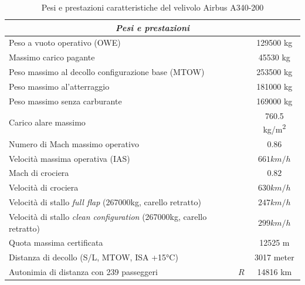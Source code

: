 \begin{table} [!h]\centering {}
	\begin{tabular}{l c c}
		\toprule
		\multicolumn{3}{c}{\emph{Pesi e prestazioni}} \\ 
		\midrule
		Peso a vuoto operativo (OWE) & \WOE & 129500 \si{kg} \\
		Massimo carico pagante & \WPLmax & 45530 \si{kg} \\
		Peso massimo al decollo configurazione base (MTOW)   &\MTOW & 253500 \si{kg} \\
		Peso massimo al'atterraggio    &\WLmax & 181000 \si{kg} \\
		Peso massimo senza carburante    &\Wzfmax & 169000 \si{kg} \\
		Carico alare massimo   &\WoverSmax & 760.5 \si{kg/m^2} \\
		\midrule		
		Numero di Mach massimo operativo & \Mmo & 0.86 \\
		Velocità massima operativa (IAS)  & \Vmo 	&  	$661 \si{km/h} $ 	\\
		Mach di crociera & \Mc &  	$0.82 $ 	\\
		Velocità di crociera & \Vc &  	$630 \si{km/h}$ 	\\
		Velocità di stallo {\itshape full flap} (267000kg, carello retratto)	 & \Vsf 	&  	$247 \si{km/h} $  	\\
		Velocità di stallo {\itshape clean configuration} (267000kg, carello retratto)   & \Vsc&  $299 \si{km/h} $	\\
    	Quota massima certificata & \hmax & 12525 \si{m}\\
		Distanza di decollo	(S/L, MTOW, ISA +15°C) &	\TOFL & 3017 \si{meter}  \\
		Autonimia di distanza con 239 passeggeri &	$R$ & 14816 \si{km}  \\
		\bottomrule
\end{tabular}
	\caption {\footnotesize Pesi e prestazioni caratteristiche del velivolo Airbus A340-200}
	\label{tabV2}
\end{table}

